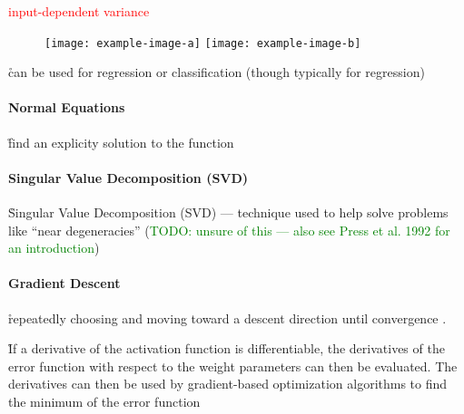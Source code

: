 \textcolor{red}{input-dependent variance}

\begin{figure}[htp]
	\centering
	\texttt{[image: example-image-a]}\hfil
	\texttt{[image: example-image-b]}\hfil
	\caption{ }
	\label{fig:basics_error_fn_sumofsquares_outlier}
\end{figure}

\r{can be used for regression or classification (though typically for regression)}

 
\paragraph{Normal Equations}

\r{find an explicity solution to the function}

\paragraph{Singular Value Decomposition (SVD)}

\r{Singular Value Decomposition (SVD) --- technique used to help solve problems like ``near degeneracies'' (\textcolor{green}{TODO: unsure of this --- also see Press et al. 1992 for an introduction})}


\paragraph{Gradient Descent}

\r{repeatedly choosing and moving toward a descent direction until convergence} . 


\r{If a derivative of the activation function is differentiable, the derivatives of the error function with respect to the weight parameters can then be evaluated. The derivatives can then be used by gradient-based optimization algorithms to find the minimum of the error function }


